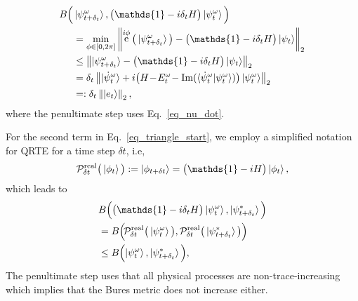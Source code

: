 \documentclass[twocolumn, aps, pra, superscriptaddress]{revtex4-1}
\DeclareMathOperator{\ee}{e}
\newcommand{\norm}[1]{\left\lVert#1\right\rVert}
\begin{document}
\begin{align}
     &B\Big(\ket{\psi^{\omega}_{t+\delta_t}}, \big(\mathds{1}-i\delta_tH\big)\ket{\psi^{\omega}_{t}} \Big) \nonumber \\
     &\hspace{5mm}=\min_{\phi \in [0,2\pi]}\norm{\ee^{i\phi}\big(\ket{\psi^{\omega}_{t+\delta_t}} \big) - \big(\mathds{1}-i\delta_tH\big)\ket{\psi _{t}}}_2 \nonumber\\
     &\hspace{5mm}\leq \norm{\ket{\psi^{\omega}_{t+\delta_t}}- \big(\mathds{1}-i\delta_tH\big)\ket{\psi _{t}}}_2 \nonumber\\
     &\hspace{5mm}=\delta_t \norm{\ket{\dot\psi^{\omega}_t}  + i\big(H\!-\!E_t^{\omega}\!-\! \,\text{Im}(\braket{\dot\psi^{\omega}_t|\psi^{\omega}_t}) \big)\ket{\psi^{\omega}_t}
    }_2 \nonumber \\
     &\hspace{5mm}=: \delta_t\norm{\ket{e_t}}_2, \label{eq_triangle_part1}
\end{align}
where the penultimate step uses Eq.~\eqref{eq_nu_dot}.

For the second term in Eq.~\eqref{eq_triangle_start}, we employ a simplified notation for QRTE for a time step $\delta t$, i.e,
\begin{align}
    \mathcal{P}^{\text{real}}_{\delta t}\big(\ket{\phi_t}\big) := \ket{\phi_{t+\delta t}} = \big(\mathds{1} - iH\big) \ket{\phi_t},
\end{align}
which leads to 
\begin{align}
\label{eq_triangle_part2}
     &B\Big(\big(\mathds{1}-i\delta_tH\big)\ket{\psi^{\omega}_{t}}, \ket{\psi^*_{t+\delta_t}}\Big) \\
     &\hspace{0mm}=B\Big(\!\mathcal{P}^{\text{real}}_{\delta t}\big(\ket{\psi^{\omega}_t}\big), \mathcal{P}^{\text{real}}_{\delta t}\big(\ket{\psi^*_{t+\delta_t}}\big) \Big) \\
     &\leq B\Big(\!\ket{\psi^{\omega}_t}, \ket{\psi^*_{t+\delta_t}} \Big),
\end{align}
The penultimate step uses that all physical processes are non-trace-increasing \cite{nielsen10} which implies that the Bures metric does not increase either.
\end{document}
